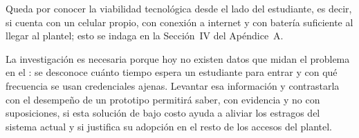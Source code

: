 Queda por conocer la viabilidad tecnológica desde el lado del estudiante, es
decir, si cuenta con un celular propio, con conexión a internet y con batería
suficiente al llegar al plantel; esto se indaga en la Sección~IV del
Apéndice~A.

La investigación es necesaria porque hoy no existen datos que midan el
problema en el \tescha{}: se desconoce cuánto tiempo espera un estudiante para
entrar y con qué frecuencia se usan credenciales ajenas. Levantar esa información y
contrastarla con el desempeño de un prototipo permitirá saber, con evidencia y
no con suposiciones, si esta solución de bajo costo ayuda a aliviar los
estragos del sistema actual y si justifica su adopción en el resto de los
accesos del plantel.
